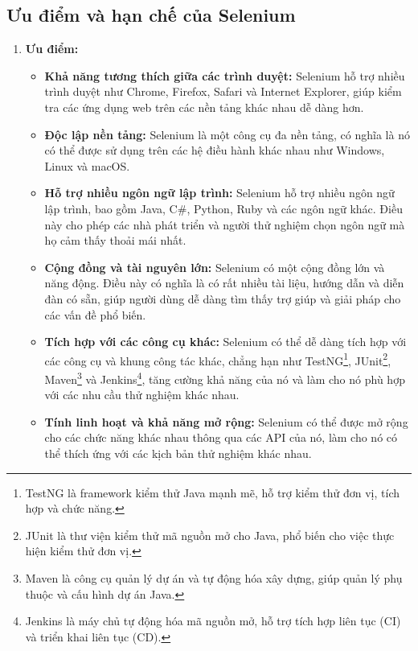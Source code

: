 \subsection{Ưu điểm và hạn chế của Selenium}
\begin{enumerate}
    \item []
    \textbf{Ưu điểm:}
    \begin{itemize}[left=0.5cm] 
        \item[-] \textbf{Khả năng tương thích giữa các trình duyệt:} Selenium hỗ trợ nhiều trình duyệt như Chrome, Firefox, Safari và Internet Explorer, giúp kiểm tra các ứng dụng web trên các nền tảng khác nhau dễ dàng hơn.
        
        \item[-]\textbf{Độc lập nền tảng:} Selenium là một công cụ đa nền tảng, có nghĩa là nó có thể được sử dụng trên các hệ điều hành khác nhau như Windows, Linux và macOS.
        
        \item[-]\textbf{Hỗ trợ nhiều ngôn ngữ lập trình:} Selenium hỗ trợ nhiều ngôn ngữ lập trình, bao gồm Java, C\#, Python, Ruby và các ngôn ngữ khác. Điều này cho phép các nhà phát triển và người thử nghiệm chọn ngôn ngữ mà họ cảm thấy thoải mái nhất.
        
        \item[-]\textbf{Cộng đồng và tài nguyên lớn:} Selenium có một cộng đồng lớn và năng động. Điều này có nghĩa là có rất nhiều tài liệu, hướng dẫn và diễn đàn có sẵn, giúp người dùng dễ dàng tìm thấy trợ giúp và giải pháp cho các vấn đề phổ biến.
        
        \item[-]\textbf{Tích hợp với các công cụ khác:} Selenium có thể dễ dàng tích hợp với các công cụ và khung công tác khác, chẳng hạn như TestNG\footnote{TestNG là framework kiểm thử Java mạnh mẽ, hỗ trợ kiểm thử đơn vị, tích hợp và chức năng.},
        JUnit\footnote{JUnit là thư viện kiểm thử mã nguồn mở cho Java, phổ biến cho việc thực hiện kiểm thử đơn vị.}, Maven\footnote{Maven là công cụ quản lý dự án và tự động hóa xây dựng, giúp quản lý phụ thuộc và cấu hình dự án Java.} và Jenkins\footnote{Jenkins là máy chủ tự động hóa mã nguồn mở, hỗ trợ tích hợp liên tục (CI) và triển khai liên tục (CD).}, tăng cường khả năng của nó và làm cho nó phù hợp với các nhu cầu thử nghiệm khác nhau.
        
        \item[-]\textbf{Tính linh hoạt và khả năng mở rộng:} Selenium có thể được mở rộng cho các chức năng khác nhau thông qua các API của nó, làm cho nó có thể thích ứng với các kịch bản thử nghiệm khác nhau.
        

\end{itemize}
\end{enumerate}
